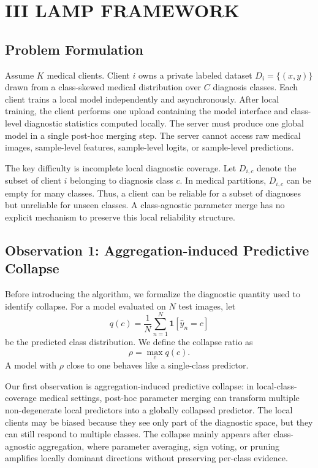 \section{III LAMP FRAMEWORK}

\subsection{Problem Formulation}

Assume $K$ medical clients. Client $i$ owns a private labeled dataset $D_i=\{(x,y)\}$ drawn from a class-skewed medical distribution over $C$ diagnosis classes. Each client trains a local model independently and asynchronously. After local training, the client performs one upload containing the model interface and class-level diagnostic statistics computed locally. The server must produce one global model in a single post-hoc merging step. The server cannot access raw medical images, sample-level features, sample-level logits, or sample-level predictions.

The key difficulty is incomplete local diagnostic coverage. Let $D_{i,c}$ denote the subset of client $i$ belonging to diagnosis class $c$. In medical partitions, $D_{i,c}$ can be empty for many classes. Thus, a client can be reliable for a subset of diagnoses but unreliable for unseen classes. A class-agnostic parameter merge has no explicit mechanism to preserve this local reliability structure.

\subsection{Observation 1: Aggregation-induced Predictive Collapse}

Before introducing the algorithm, we formalize the diagnostic quantity used to identify collapse. For a model evaluated on $N$ test images, let
\[
q(c)=\frac{1}{N}\sum_{n=1}^{N}\mathbf{1}[\hat y_n=c]
\]
be the predicted class distribution. We define the collapse ratio as
\[
\rho=\max_c q(c).
\]
A model with $\rho$ close to one behaves like a single-class predictor.

Our first observation is aggregation-induced predictive collapse: in local-class-coverage medical settings, post-hoc parameter merging can transform multiple non-degenerate local predictors into a globally collapsed predictor. The local clients may be biased because they see only part of the diagnostic space, but they can still respond to multiple classes. The collapse mainly appears after class-agnostic aggregation, where parameter averaging, sign voting, or pruning amplifies locally dominant directions without preserving per-class evidence.

